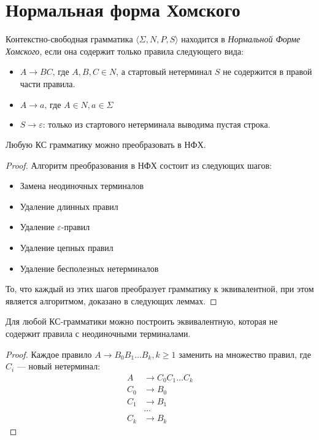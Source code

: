 \section{Нормальная форма Хомского}
\label{section:CNF}

\begin{definition}
Контекстно-свободная грамматика $\langle \Sigma, N, P, S\rangle$ находится в \textit{Нормальной Форме Хомского}, если она содержит только правила следующего вида:

\begin{itemize}
  \item $A \to B C \text{, где } A, B, C \in N$, а стартовый нетерминал $S$ не содержится в правой части правила.
  \item $A \to a \text{, где } A \in N, a \in \Sigma$
  \item $S \to \varepsilon$: только из стартового нетерминала выводима пустая строка.
\end{itemize}
\end{definition}

\begin{theorem}
Любую КС грамматику можно преобразовать в НФХ.
\end{theorem}

\begin{proof}
  Алгоритм преобразования в НФХ состоит из следующих шагов:

  \begin{itemize}
    \item Замена неодиночных терминалов
    \item Удаление длинных правил
    \item Удаление $\varepsilon$-правил
    \item Удаление цепных правил
    \item Удаление бесполезных нетерминалов
  \end{itemize}

  То, что каждый из этих шагов преобразует грамматику к эквивалентной, при этом является алгоритмом, доказано в следующих леммах.
\end{proof}

\begin{lemma}
  Для любой КС-грамматики можно построить эквивалентную, которая не содержит правила с неодиночными терминалами.
\end{lemma}

\begin{proof}
  Каждое правило $A \to B_0 B_1 \dots B_k, k \geq 1$ заменить на множество правил, где $C_i$ --- новый нетерминал:
\begin{align*}
  A & \to C_0 C_1 \dots C_k \\
  C_0 & \to B_0 \\
  C_1 & \to B_1 \\
      & \dots \\
  C_k & \to B_k
\end{align*}
\end{proof}

